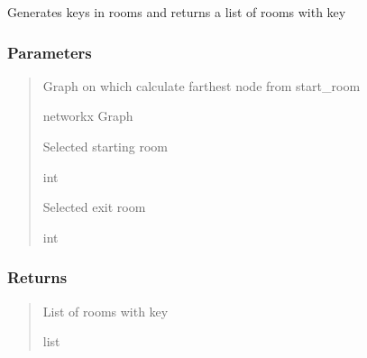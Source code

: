 \documentclass[letterpaper,10pt,english]{sphinxmanual}
\begin{document}

\begin{fulllineitems}
\label{\detokenize{api_reference/dungeon_resolver/generate_dungeon_problem:generate_dungeon_problem.generate_keys}}
\pysigstartsignatures
{}
\pysigstopsignatures
\sphinxAtStartPar
Generates keys in rooms and returns a list of rooms with key


\subsubsection{Parameters}
\label{\detokenize{api_reference/dungeon_resolver/generate_dungeon_problem:id5}}\begin{quote}\begin{description}
\sphinxAtStartPar
Graph on which calculate farthest node from start\_room

\sphinxAtStartPar
networkx Graph

\sphinxAtStartPar
Selected starting room

\sphinxAtStartPar
int

\sphinxAtStartPar
Selected exit room

\sphinxAtStartPar
int

\end{description}\end{quote}


\subsubsection{Returns}
\label{\detokenize{api_reference/dungeon_resolver/generate_dungeon_problem:id6}}\begin{quote}\begin{description}
\sphinxAtStartPar
List of rooms with key

\sphinxAtStartPar
list

\end{description}\end{quote}

\end{fulllineitems}
\end{document}
